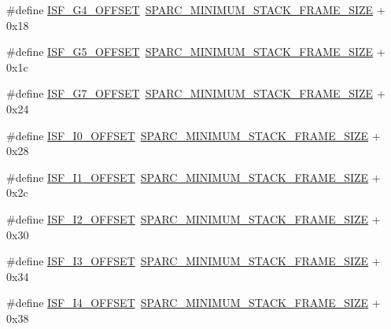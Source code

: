 \begin{DoxyCompactItemize}
\item 
\#define \mbox{\hyperlink{group__RTEMSScoreCPUSPARC_gacecfd76abc0224920501a2ed60f846f1}{I\+S\+F\+\_\+\+G4\+\_\+\+O\+F\+F\+S\+ET}}~\mbox{\hyperlink{group__RTEMSScoreCPUSPARC_ga8e296685f05588131b26bdc695cb9b8c}{S\+P\+A\+R\+C\+\_\+\+M\+I\+N\+I\+M\+U\+M\+\_\+\+S\+T\+A\+C\+K\+\_\+\+F\+R\+A\+M\+E\+\_\+\+S\+I\+ZE}} + 0x18
\item 
\#define \mbox{\hyperlink{group__RTEMSScoreCPUSPARC_gafee2800a878c90316a7d05e15b2192ea}{I\+S\+F\+\_\+\+G5\+\_\+\+O\+F\+F\+S\+ET}}~\mbox{\hyperlink{group__RTEMSScoreCPUSPARC_ga8e296685f05588131b26bdc695cb9b8c}{S\+P\+A\+R\+C\+\_\+\+M\+I\+N\+I\+M\+U\+M\+\_\+\+S\+T\+A\+C\+K\+\_\+\+F\+R\+A\+M\+E\+\_\+\+S\+I\+ZE}} + 0x1c
\item 
\#define \mbox{\hyperlink{group__RTEMSScoreCPUSPARC_gae10babd83c58bb7da67ad6064557dc7b}{I\+S\+F\+\_\+\+G7\+\_\+\+O\+F\+F\+S\+ET}}~\mbox{\hyperlink{group__RTEMSScoreCPUSPARC_ga8e296685f05588131b26bdc695cb9b8c}{S\+P\+A\+R\+C\+\_\+\+M\+I\+N\+I\+M\+U\+M\+\_\+\+S\+T\+A\+C\+K\+\_\+\+F\+R\+A\+M\+E\+\_\+\+S\+I\+ZE}} + 0x24
\item 
\#define \mbox{\hyperlink{group__RTEMSScoreCPUSPARC_gace6b316101a61770e51654d9ebfac7ba}{I\+S\+F\+\_\+\+I0\+\_\+\+O\+F\+F\+S\+ET}}~\mbox{\hyperlink{group__RTEMSScoreCPUSPARC_ga8e296685f05588131b26bdc695cb9b8c}{S\+P\+A\+R\+C\+\_\+\+M\+I\+N\+I\+M\+U\+M\+\_\+\+S\+T\+A\+C\+K\+\_\+\+F\+R\+A\+M\+E\+\_\+\+S\+I\+ZE}} + 0x28
\item 
\#define \mbox{\hyperlink{group__RTEMSScoreCPUSPARC_ga5c58bc3d42aeb317dc2dfd7e967a923b}{I\+S\+F\+\_\+\+I1\+\_\+\+O\+F\+F\+S\+ET}}~\mbox{\hyperlink{group__RTEMSScoreCPUSPARC_ga8e296685f05588131b26bdc695cb9b8c}{S\+P\+A\+R\+C\+\_\+\+M\+I\+N\+I\+M\+U\+M\+\_\+\+S\+T\+A\+C\+K\+\_\+\+F\+R\+A\+M\+E\+\_\+\+S\+I\+ZE}} + 0x2c
\item 
\#define \mbox{\hyperlink{group__RTEMSScoreCPUSPARC_ga8b5cbda6e7e4ed02348bdbd8e93e7e2d}{I\+S\+F\+\_\+\+I2\+\_\+\+O\+F\+F\+S\+ET}}~\mbox{\hyperlink{group__RTEMSScoreCPUSPARC_ga8e296685f05588131b26bdc695cb9b8c}{S\+P\+A\+R\+C\+\_\+\+M\+I\+N\+I\+M\+U\+M\+\_\+\+S\+T\+A\+C\+K\+\_\+\+F\+R\+A\+M\+E\+\_\+\+S\+I\+ZE}} + 0x30
\item 
\#define \mbox{\hyperlink{group__RTEMSScoreCPUSPARC_ga172f4db05c181f867781d188c56856b0}{I\+S\+F\+\_\+\+I3\+\_\+\+O\+F\+F\+S\+ET}}~\mbox{\hyperlink{group__RTEMSScoreCPUSPARC_ga8e296685f05588131b26bdc695cb9b8c}{S\+P\+A\+R\+C\+\_\+\+M\+I\+N\+I\+M\+U\+M\+\_\+\+S\+T\+A\+C\+K\+\_\+\+F\+R\+A\+M\+E\+\_\+\+S\+I\+ZE}} + 0x34
\item 
\#define \mbox{\hyperlink{group__RTEMSScoreCPUSPARC_ga330fc497aa2d97a8710bbd9ae8e293cd}{I\+S\+F\+\_\+\+I4\+\_\+\+O\+F\+F\+S\+ET}}~\mbox{\hyperlink{group__RTEMSScoreCPUSPARC_ga8e296685f05588131b26bdc695cb9b8c}{S\+P\+A\+R\+C\+\_\+\+M\+I\+N\+I\+M\+U\+M\+\_\+\+S\+T\+A\+C\+K\+\_\+\+F\+R\+A\+M\+E\+\_\+\+S\+I\+ZE}} + 0x38

\end{DoxyCompactItemize}
